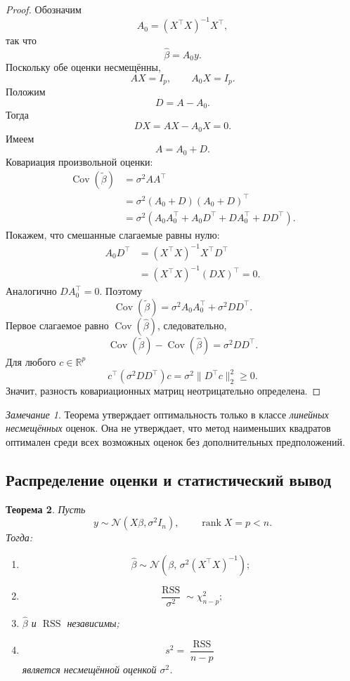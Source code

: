 \documentclass[12pt,a4paper]{article}
\newtheorem{theorem}{Теорема}[section]
\theoremstyle{definition}
\theoremstyle{remark}
\newtheorem{remark}[theorem]{Замечание}
\newcommand{\R}{\mathbb{R}}
\newcommand{\Cov}{\operatorname{Cov}}
\newcommand{\rank}{\operatorname{rank}}
\begin{document}
\begin{proof}
Обозначим
\[
    A_0=(X^\top X)^{-1}X^\top,
\]
так что
\[
    \widehat\beta=A_0y.
\]
Поскольку обе оценки несмещённы,
\[
    AX=I_p,
    \qquad
    A_0X=I_p.
\]
Положим
\[
    D=A-A_0.
\]
Тогда
\[
    DX=AX-A_0X=0.
\]
Имеем
\[
    A=A_0+D.
\]
Ковариация произвольной оценки:
\[
\begin{split}
    \Cov(\widetilde\beta)
    &=
    \sigma^2AA^\top\\
    &=
    \sigma^2(A_0+D)(A_0+D)^\top\\
    &=
    \sigma^2
    \left(
        A_0A_0^\top
        +A_0D^\top
        +DA_0^\top
        +DD^\top
    \right).
\end{split}
\]
Покажем, что смешанные слагаемые равны нулю:
\[
\begin{split}
    A_0D^\top
    &=
    (X^\top X)^{-1}X^\top D^\top\\
    &=
    (X^\top X)^{-1}(DX)^\top
    =
    0.
\end{split}
\]
Аналогично $DA_0^\top=0$. Поэтому
\[
    \Cov(\widetilde\beta)
    =
    \sigma^2A_0A_0^\top+\sigma^2DD^\top.
\]
Первое слагаемое равно $\Cov(\widehat\beta)$, следовательно,
\[
    \Cov(\widetilde\beta)
    -
    \Cov(\widehat\beta)
    =
    \sigma^2DD^\top.
\]
Для любого $c\in\R^p$
\[
    c^\top(\sigma^2DD^\top)c
    =
    \sigma^2\|D^\top c\|_2^2
    \geq 0.
\]
Значит, разность ковариационных матриц неотрицательно определена.
\end{proof}

\begin{remark}
Теорема утверждает оптимальность только в классе \emph{линейных
несмещённых} оценок. Она не утверждает, что метод наименьших квадратов
оптимален среди всех возможных оценок без дополнительных предположений.
\end{remark}

\subsection{Распределение оценки и статистический вывод}

\begin{theorem}
Пусть
\[
    y\sim\mathcal{N}(X\beta,\sigma^2I_n),
    \qquad
    \rank X=p<n.
\]
Тогда:

\begin{enumerate}
    \item
    \[
        \widehat\beta
        \sim
        \mathcal{N}
        \left(
            \beta,\,
            \sigma^2(X^\top X)^{-1}
        \right);
    \]
    \item
    \[
        \frac{\operatorname{RSS}}{\sigma^2}
        \sim
        \chi^2_{n-p};
    \]
    \item $\widehat\beta$ и $\operatorname{RSS}$ независимы;
    \item
    \[
        s^2=\frac{\operatorname{RSS}}{n-p}
    \]
    является несмещённой оценкой $\sigma^2$.
\end{enumerate}
\end{theorem}
\end{document}
